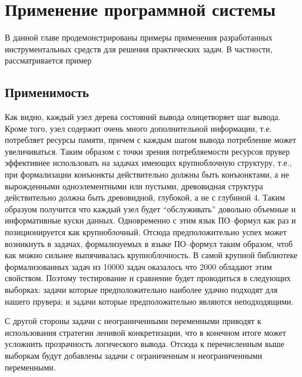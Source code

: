 \chapter{Применение программной системы}
\label{part:examples}

В данной главе продемонстрированы примеры применения разработанных инструментальных средств  для решения практических задач. В частности, рассматривается пример 

\section{Применимость}
Как видно, каждый узел дерева состояний вывода олицетворяет шаг вывода. Кроме того, узел содержит очень много дополнительной информации, т.е. потребляет ресурсы памяти, причем с каждым шагом вывода потребление может увеличиваться. Таким образом с точки зрения потребляемости ресурсов прувер эффективнее использовать на задачах имеющих крупноблочную структуру, т.е., при формализации конъюнкты действительно должны быть конъюнктами, а не вырожденными одноэлементными или пустыми, древовидная структура действительно должна быть древовидной, глубокой, а не с глубиной 4. Таким образуом получится что каждый узел будет “обслуживать” довольно объемные и информативные куски данных. Одновременно с этим язык ПО--формул как раз и позиционируется как крупноблочный. Отсюда предположительно успех может возникнуть в задачах, формализуемых в языке ПО--формул таким образом, чтоб как можно сильнее выпячивалась крупноблочность. В самой крупной библиотеке формализованных задач из 10000 задач оказалось что 2000 обладают этим свойством. Поэтому тестирование и сравнение будет проводиться в следующих выборках: задачи которые предположительно наиболее удачно подходят для нашего прувера; и задачи которые предположительно являются неподходящими. 

С другой стороны задачи с неограниченными переменными приводят к использования стратегии ленивой конкретизации, что в конечном итоге может усложнить прозрачность логического вывода. Отсюда к перечисленным выше выборкам будут добавлены задачи с ограниченным и неограниченными переменными.



